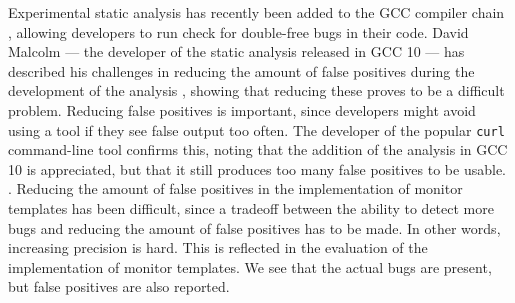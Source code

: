 \newpar Experimental static analysis has recently been added to the GCC compiler chain \cite{gcc10}, allowing developers to run check for double-free bugs in their code. David Malcolm --- the developer of the static analysis released in GCC 10 --- has described his challenges in reducing the amount of false positives during the development of the analysis \cite{gcc10-development}, showing that reducing these proves to be a difficult problem. Reducing false positives is important, since developers might avoid using a tool if they see false output too often. The developer of the popular \texttt{curl} command-line tool confirms this, noting that the addition of the analysis in GCC 10 is appreciated, but that it still produces too many false positives to be usable. \cite{curl-static-analysis}. Reducing the amount of false positives in the implementation of monitor templates has been difficult, since a tradeoff between the ability to detect more bugs and reducing the amount of false positives has to be made. In other words, increasing precision is hard. This is reflected in the evaluation of the implementation of monitor templates. We see that the actual bugs are present, but false positives are also reported. 

